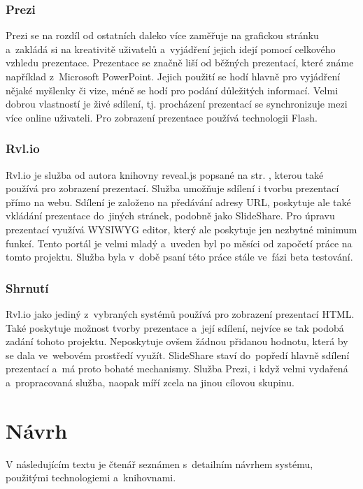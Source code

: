 \documentclass[11pt,twoside,a4paper]{book}
\begin{document}
\subsection{Prezi}
Prezi \cite{prezi} se na rozdíl od ostatních daleko více zaměřuje na grafickou stránku a~zakládá si na kreativitě uživatelů a~vyjádření jejich idejí pomocí celkového vzhledu prezentace. Prezentace se značně liší od běžných prezentací, které známe například z~Microsoft PowerPoint. Jejich použití se hodí hlavně pro vyjádření nějaké myšlenky či vize, méně se hodí pro podání důležitých informací. Velmi dobrou vlastností je živé sdílení, tj. procházení prezentací se synchronizuje mezi více online uživateli. Pro zobrazení prezentace používá technologii Flash.

\subsection{Rvl.io}
Rvl.io \cite{rvlio} je služba od autora knihovny reveal.js popsané na str. \pageref{chap:revealjs}, kterou také používá pro zobrazení prezentací. Služba umožňuje sdílení i tvorbu prezentací přímo na webu. Sdílení je založeno na předávání adresy URL, poskytuje ale také vkládání prezentace do~jiných stránek, podobně jako SlideShare. Pro úpravu prezentací využívá WYSIWYG editor, který ale poskytuje jen nezbytné minimum funkcí. Tento portál je velmi mladý a~uveden byl po měsíci od započetí práce na tomto projektu. Služba byla v~době psaní této práce stále ve~fázi beta testování.

\subsection{Shrnutí}
Rvl.io jako jediný z~vybraných systémů používá pro zobrazení prezentací HTML. Také poskytuje možnost tvorby prezentace a~její sdílení, nejvíce se tak podobá zadání tohoto projektu. Neposkytuje ovšem žádnou přidanou hodnotu, která by se dala ve~webovém prostředí využít. SlideShare staví do~popředí hlavně sdílení prezentací a~má proto bohaté mechanismy. Služba Prezi, i když velmi vydařená a~propracovaná služba, naopak míří zcela na jinou cílovou skupinu.



\chapter{Návrh}
V následujícím textu je čtenář seznámen s~detailním návrhem systému, použitými technologiemi a~knihovnami.
\end{document}
